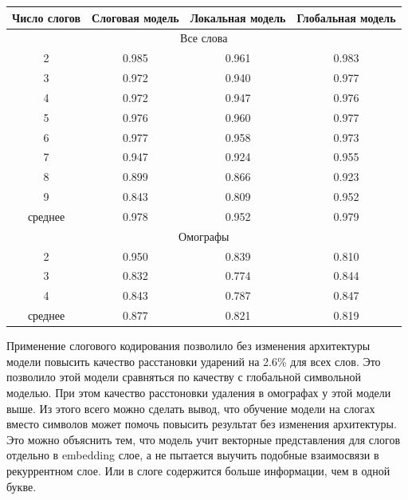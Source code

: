 \documentclass[14pt, a4paper, russian]{report}
\begin{document}
\begin{normalsize}
\begin{table}[H]
	\begin{small}
		\begin{center}
			\begin{tabular}{|c|c|c|c|}
				\hline
				Число слогов & Слоговая модель & Локальная модель & Глобальная модель \\ \hline
				\multicolumn{4}{|c|}{Все слова}                                       \\ \hline
				2       &      0.985      &      0.961       &       0.983       \\ \hline
				3       &      0.972      &      0.940       &       0.977       \\ \hline
				4       &      0.972      &      0.947       &       0.976       \\ \hline
				5       &      0.976      &      0.960       &       0.977       \\ \hline
				6       &      0.977      &      0.958       &       0.973       \\ \hline
				7       &      0.947      &      0.924       &       0.955       \\ \hline
				8       &      0.899      &      0.866       &       0.923       \\ \hline
				9       &      0.843      &      0.809       &       0.952       \\ \hline
				среднее    &      0.978      &      0.952       &       0.979       \\ \hline
				\multicolumn{4}{|c|}{Омографы}                                        \\ \hline
				2       &      0.950      &      0.839       &       0.810       \\ \hline
				3       &      0.832      &      0.774       &       0.844       \\ \hline
				4       &      0.843      &      0.787       &       0.847       \\ \hline
				среднее    &      0.877      &      0.821       &       0.819       \\ \hline
			\end{tabular}
		\end{center}
	\end{small}
	\label{table:local_syl}
\end{table}

Применение слогового кодирования позволило без изменения архитектуры модели повысить качество расстановки ударений на 2.6\% для всех слов. Это позволило этой модели сравняться по качеству с глобальной символьной моделью. При этом качество расстоновки удаления в омографах у этой модели выше. Из этого всего можно сделать вывод, что обучение модели на слогах вместо символов может помочь повысить результат  без изменения архитектуры. Это можно объяснить тем, что модель учит векторные представления для слогов отдельно в embedding слое, а не пытается выучить подобные взаимосвязи в рекуррентном слое. Или  в слоге содержится больше информации, чем в одной букве.


\end{normalsize}
\end{document}
